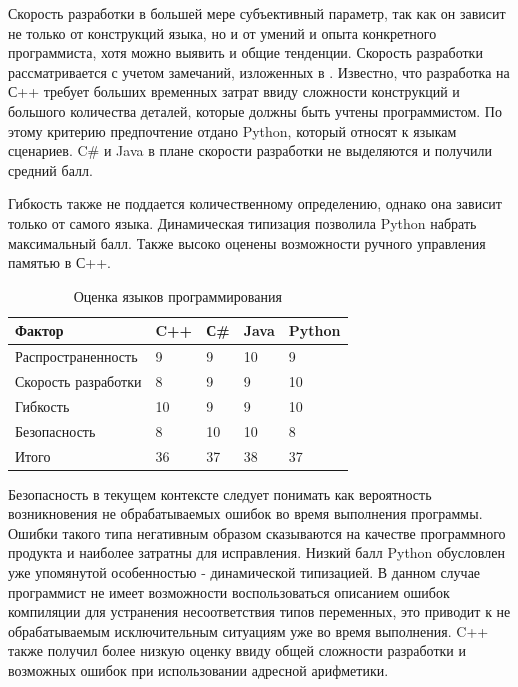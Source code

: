 \documentclass[14pt,oneside,final]{extreport}
\begin{document}
	Скорость разработки в большей мере субъективный параметр, так как он зависит не только от конструкций языка, но и от умений и опыта конкретного программиста, хотя можно выявить и общие тенденции. Скорость разработки рассматривается с учетом замечаний, изложенных в \cite{web:DZone}. Известно, что разработка на С++ требует больших временных затрат ввиду сложности конструкций и большого количества деталей, которые должны быть учтены программистом. По этому критерию предпочтение отдано Python, который относят к языкам сценариев. C\# и Java в плане скорости разработки не выделяются и получили средний балл.
	
	Гибкость также не поддается количественному определению, однако она зависит только от самого языка. Динамическая типизация позволила Python набрать максимальный балл. Также высоко оценены возможности ручного управления памятью в С++.
   
	\begin{table}[htb]
	\centering
	\caption{Оценка языков программирования}\label{tab:lang-rank} 
	\begin{tabularx}{\textwidth}{|l|Z|Z|Z|Z|}

		\hline Фактор & C++ & С\# & Java & Python \\ 
		\hline Распространенность & 9 & 9 & 10 & 9 \\ 
		\hline Скорость разработки & 8 & 9 & 9 & 10 \\ 
		\hline Гибкость & 10 & 9 & 9 & 10 \\ 
		\hline Безопасность & 8 & 10 & 10 & 8 \\ 
		\hline Итого & 36 & 37 & 38 & 37 \\ 
		\hline 
	\end{tabularx}
	\end{table}
	
	
	Безопасность в текущем контексте следует понимать как вероятность возникновения не обрабатываемых ошибок во время выполнения программы. Ошибки такого типа негативным образом сказываются на качестве программного продукта и наиболее затратны для исправления. Низкий балл Python обусловлен уже упомянутой особенностью  - динамической типизацией. В данном случае программист не имеет возможности воспользоваться описанием ошибок компиляции для устранения несоответствия типов переменных, это приводит к не обрабатываемым исключительным ситуациям уже во время выполнения. C++ также получил более низкую оценку ввиду общей сложности разработки и возможных ошибок при использовании адресной арифметики.
		
\end{document}
